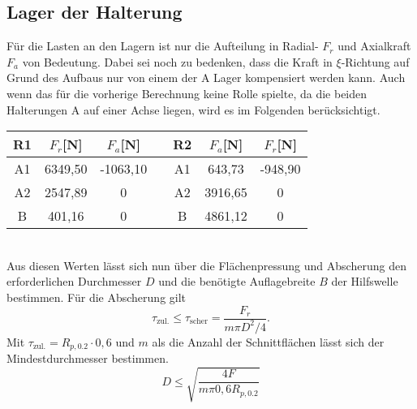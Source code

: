 \subsection{Lager der Halterung}
Für die Lasten an den Lagern ist nur die Aufteilung in Radial- $F_r$ und Axialkraft $F_a$ von Bedeutung. Dabei sei noch zu bedenken, dass die Kraft in $\xi$-Richtung auf Grund des Aufbaus nur von einem der A Lager kompensiert werden kann. Auch wenn das für die vorherige Berechnung keine Rolle spielte, da die beiden Halterungen A auf einer Achse liegen, wird es im Folgenden berücksichtigt.
\begin{table}[h] 
	\centering 
	\begin{tabular}{c|c|cc||c|c|c} 
		\textbf{R1}&$F_{r}$[N]&$F_a$[N]&&\textbf{R2}&$F_{a}$[N]&$F_r$[N]\\ 
		\hline 
		A1& 6349,50&-1063,10&&A1&643,73&-948,90\\
		A2&2547,89&0&&A2&3916,65&0\\
		B&401,16&0&&B&4861,12&0\\
	\end{tabular}
\end{table} \\
Aus diesen Werten lässt sich nun über die Flächenpressung und Abscherung den erforderlichen Durchmesser $D$ und die benötigte Auflagebreite $B$ der Hilfswelle bestimmen. Für die Abscherung gilt
\begin{equation}
	\tau_{\mathrm{zul.}}\leq\tau_\mathrm{scher}=\frac{F_r}{m\pi D^2/4}.
\end{equation}
Mit $\tau_{\mathrm{zul.}}=R_{p, 0.2}\cdot 0,6$ \cite{metall} und $m$ als die Anzahl der Schnittflächen lässt sich der Mindestdurchmesser bestimmen.
\begin{equation}
	D \leq \sqrt{\frac{4F}{m\pi 0,6 R_{p, 0.2}}}
\end{equation}
